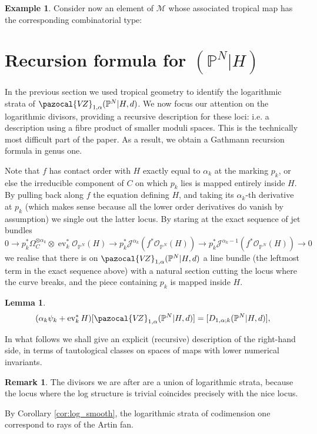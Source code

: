 \documentclass[11pt]{amsart}
\newcommand{\PP}{\mathbb P}
\newcommand{\VZ}{\pazocal{V\!Z}}
\newcommand{\OO}{\mathcal{O}}
\renewcommand{\to}{\rightarrow}
\newcommand{\ev}{\operatorname{ev}}
\newcommand{\Mcal}{\mathcal{M}}
\theoremstyle{definition}
\newtheorem{lem}[thm]{Lemma}
\theoremstyle{definition}
\newtheorem{example}[thm]{Example}
\newtheorem{remark}[thm]{Remark}
\begin{document}
\begin{example}
Consider now an element of $\Mcal$ whose associated tropical map has the corresponding combinatorial type:


\end{example}

\newpage

\section{Recursion formula for $(\PP^N|H)$}

In the previous section we used tropical geometry to identify the logarithmic strata of $\VZ_{1,\alpha}(\PP^N|H,d)$. We now focus our attention on the logarithmic divisors, providing a recursive description for these loci: i.e. a description using a fibre product of smaller moduli spaces. This is the technically most difficult part of the paper. As a result, we obtain a Gathmann recursion formula in genus one.

Note that $f$ has contact order with $H$ exactly equal to $\alpha_k$ at the marking $p_k$, or else the irreducible component of $C$ on which $p_k$ lies is mapped entirely inside $H$. By pulling back along $f$ the equation defining $H$, and taking its $\alpha_k$-th derivative at $p_k$ (which makes sense because all the lower order derivatives do vanish by assumption) we single out the latter locus. By staring at the exact sequence of jet bundles
\[0\to p_k^*\Omega_{C}^{\otimes\alpha_k}\otimes\ev_k^*\OO_{\PP^N}(H)\to p_k^*\mathcal J^{\alpha_k}(f^*\OO_{\PP^N}(H))\to p_k^*\mathcal J^{\alpha_k-1}(f^*\OO_{\PP^N}(H))\to 0\]
we realise that there is on $\VZ_{1,\alpha}(\PP^N|H,d)$ a line bundle (the leftmost term in the exact sequence above) with a natural section cutting the locus where the curve breaks, and the piece containing $p_k$ is mapped inside $H$.
\begin{lem}
 \[(\alpha_k\psi_k+\ev_k^*H)[\VZ_{1,\alpha}(\PP^N|H,d)]=[D_{1,\alpha;k}(\PP^N|H,d)],\]
\end{lem}
In what follows we shall give an explicit (recursive) description of the right-hand side, in terms of tautological classes on spaces of maps with lower numerical invariants.
\begin{remark}
 The divisors we are after are a union of logarithmic strata, because the locus where the log structure is trivial coincides precisely with the nice locus.
\end{remark}
By Corollary \ref{cor:log_smooth}, the logarithmic strata of codimension one correspond to rays of the Artin fan.
\end{document}
